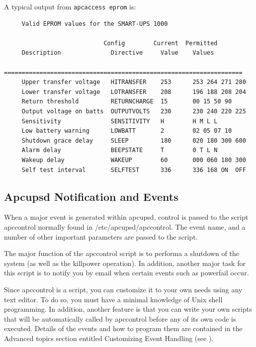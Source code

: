 {{A typical output from {\tt apcaccess eprom} is: 

\footnotesize
\begin{verbatim}
     Valid EPROM values for the SMART-UPS 1000
     
                            Config        Current  Permitted
     Description              Directive     Value    Values
     ===================================================================
     Upper transfer voltage   HITRANSFER    253      253 264 271 280
     Lower transfer voltage   LOTRANSFER    208      196 188 208 204
     Return threshold         RETURNCHARGE  15       00 15 50 90
     Output voltage on batts  OUTPUTVOLTS   230      230 240 220 225
     Sensitivity              SENSITIVITY   H        H M L L
     Low battery warning      LOWBATT       2        02 05 07 10
     Shutdown grace delay     SLEEP         180      020 180 300 600
     Alarm delay              BEEPSTATE     T        0 T L N
     Wakeup delay             WAKEUP        60       000 060 180 300
     Self test interval       SELFTEST      336      336 168 ON  OFF
\end{verbatim}
\normalsize

\label{Apcupsd-Notification-and-Events}

\subsection*{Apcupsd Notification and Events}

\label{index-Notification-116}
\label{index-Events-117}
When a major event is generated within apcupsd, control is passed to the
script apccontrol normally found in /etc/apcupsd/apccontrol. The event name,
and a number of other important parameters are passed to the script.  

The major function of the apccontrol script is to performa a shutdown of the
system (as well as the killpower operation). In addition, another major task
for this script is to notify you by email when certain events such as
powerfail occur.  

Since apccontrol is a script, you can customize it to your own needs using any
text editor. To do so, you must have a minimal knowledge of Unix shell
programming. In addition, another feature is that you can write your own
scripts that will be automatically called by apccontrol before any of its own
code is executed. Details of the events and how to program them are contained
in the Advanced topics section entitled Customizing Event Handling (see 
). 

}}

